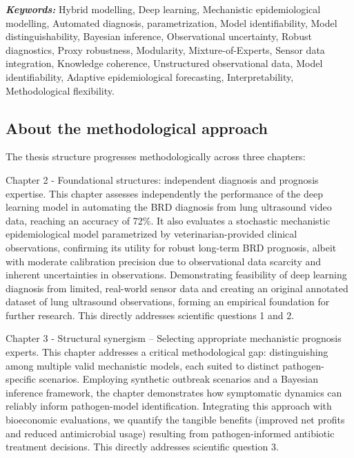 \textit{\textbf{Keywords:}} Hybrid modelling, Deep learning, Mechanistic epidemiological modelling, Automated diagnosis, parametrization, Model identifiability, Model distinguishability, Bayesian inference, Observational uncertainty, Robust diagnostics, Proxy robustness, Modularity, Mixture-of-Experts, Sensor data integration, Knowledge coherence, Unstructured observational data, Model identifiability, Adaptive epidemiological forecasting, Interpretability, Methodological flexibility.


\subsection{About the methodological approach}

The thesis structure progresses methodologically across three chapters:

Chapter 2 - Foundational structures: independent diagnosis and prognosis expertise. 
This chapter assesses independently the performance of the deep learning model in automating the BRD diagnosis from lung ultrasound video data, reaching an accuracy of 72\%. It also evaluates a stochastic mechanistic epidemiological model parametrized by veterinarian-provided clinical observations, confirming its utility for robust long-term BRD prognosis, albeit with moderate calibration precision due to observational data scarcity and inherent uncertainties in observations. Demonstrating feasibility of deep learning diagnosis from limited, real-world sensor data and creating an original annotated dataset of lung ultrasound observations, forming an empirical foundation for further research. This directly addresses scientific questions 1 and 2.

Chapter 3 - Structural synergism – Selecting appropriate mechanistic prognosis experts. This chapter addresses a critical methodological gap: distinguishing among multiple valid mechanistic models, each suited to distinct pathogen-specific scenarios. Employing synthetic outbreak scenarios and a Bayesian inference framework, the chapter demonstrates how symptomatic dynamics can reliably inform pathogen-model identification. Integrating this approach with bioeconomic evaluations, we quantify the tangible benefits (improved net profits and reduced antimicrobial usage) resulting from pathogen-informed antibiotic treatment decisions. This directly addresses scientific question 3.

